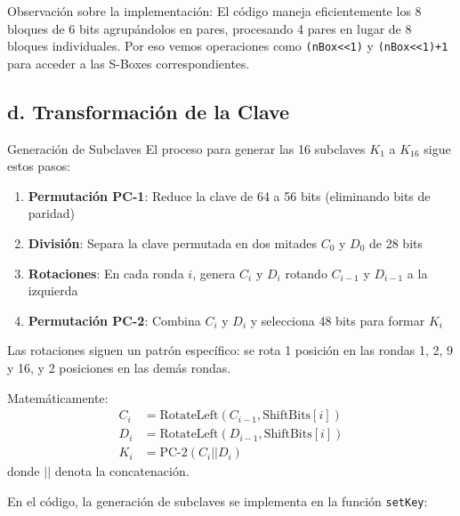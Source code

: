 \begin{securitygoodpractice}
	Observación sobre la implementación: El código maneja eficientemente los 8 bloques de 6 bits agrupándolos en pares, procesando 4 pares en lugar de 8 bloques individuales. Por eso vemos operaciones como \texttt{(nBox<<1)} y \texttt{(nBox<<1)+1} para acceder a las S-Boxes correspondientes.
\end{securitygoodpractice}

\subsection{d. Transformación de la Clave}

\begin{cryptomethod}{Generación de Subclaves}
	El proceso para generar las 16 subclaves $K_1$ a $K_{16}$ sigue estos pasos:

	\begin{enumerate}
		\item \textbf{Permutación PC-1}: Reduce la clave de 64 a 56 bits (eliminando bits de paridad)
		\item \textbf{División}: Separa la clave permutada en dos mitades $C_0$ y $D_0$ de 28 bits
		\item \textbf{Rotaciones}: En cada ronda $i$, genera $C_i$ y $D_i$ rotando $C_{i-1}$ y $D_{i-1}$ a la izquierda
		\item \textbf{Permutación PC-2}: Combina $C_i$ y $D_i$ y selecciona 48 bits para formar $K_i$
	\end{enumerate}

	Las rotaciones siguen un patrón específico: se rota 1 posición en las rondas 1, 2, 9 y 16, y 2 posiciones en las demás rondas.

	Matemáticamente:
	\begin{align}
		C_i & = \text{RotateLeft}(C_{i-1}, \text{ShiftBits}[i]) \\
		D_i & = \text{RotateLeft}(D_{i-1}, \text{ShiftBits}[i]) \\
		K_i & = \text{PC-2}(C_i || D_i)
	\end{align}
	donde $||$ denota la concatenación.
\end{cryptomethod}

En el código, la generación de subclaves se implementa en la función \texttt{setKey}:

